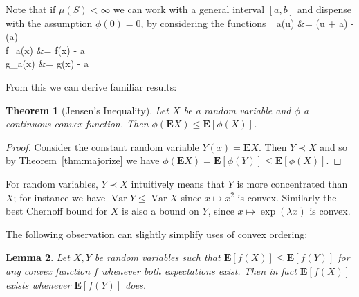 \documentclass{article}
\newtheorem{theorem}{Theorem}
\newtheorem{lemma}[theorem]{Lemma}
\newcommand*{\E}[0]{\mathbf{E}}
\DeclareMathOperator*{\Var}{\mathrm{Var}}
\def\[#1\]{\begin{align*}#1\end{align*}}
\begin{document}
Note that if $\mu(S) < \infty$ we can work with a general interval $[a, b]$ and dispense with the assumption $\phi(0) = 0$,
by considering the functions \[\phi_a(u) &= \phi(u + a) - \phi(a) \\ f_a(x) &= f(x) - a \\ g_a(x) &= g(x) - a\]



From this we can derive familiar results:

\begin{theorem}[Jensen's Inequality]
  Let $X$ be a random variable and $\phi$ a continuous convex function. %
  Then $\phi(\E X) \le \E[\phi(X)]$.
\end{theorem}
\begin{proof}
  Consider the constant random variable $Y(x) = \E X$.
  Then $Y \prec X$ and so by Theorem~\ref{thm:majorize} we have
  $\phi(\E X) = \E[\phi(Y)] \le \E[\phi(X)]$.
\end{proof}

For random variables, $Y \prec X$ intuitively means that $Y$ is more concentrated than $X$; for instance we have $\Var Y \le \Var X$ since $x \mapsto x^2$ is convex.  Similarly the best Chernoff bound for $X$ is also a bound on $Y$, since $x \mapsto \exp(\lambda x)$ is convex.


The following observation can slightly simplify uses of convex ordering:

\begin{lemma}
  \label{lem:rhs-suffices}
  Let $X, Y$ be random variables such that $\E[f(X)] \le \E[f(Y)]$ for any convex function $f$
  whenever both expectations exist.
  Then in fact $\E[f(X)]$ exists whenever $\E[f(Y)]$ does.
\end{lemma}
\end{document}
